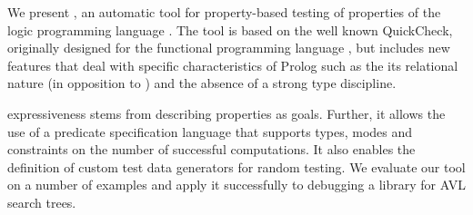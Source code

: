 

We present \Prolog\QuickCheck{}, an automatic tool for property-based
testing of properties of the logic programming language \Prolog{}.
%
The tool is based on the well known QuickCheck, originally designed
for the functional programming language \Haskell{}, but includes new
features that deal with specific characteristics of Prolog such as the
its relational nature (in opposition to \Haskell{}) and the absence
of a strong type discipline.


\Prolog\QuickCheck{} expressiveness stems from describing properties as
\Prolog{} goals.
%
Further, it allows the use of a predicate specification language that
supports types, modes and constraints on the number of successful
computations.
%
It also enables the definition of custom test data generators for
random testing.
%
We evaluate our tool on a number of  examples and apply
it successfully to debugging a \Prolog{} library for AVL search trees.

